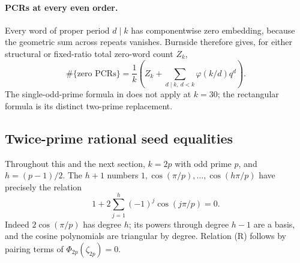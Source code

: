 \paragraph{PCRs at every even order.}
Every word of proper period $d\mid k$ has componentwise zero embedding, because the geometric sum across repeats vanishes. Burnside therefore gives, for either structural or fixed-ratio total zero-word count $Z_k$,
\[
\#\{\text{zero PCRs}\}=\frac1k\left(Z_k+\sum_{d\mid k,\ d<k}\varphi(k/d)q^d\right).
\]
The single-odd-prime formula in  does not apply at $k=30$; the rectangular formula is its distinct two-prime replacement.

\subsection{Twice-prime rational seed equalities}\label{ext:sec:seed}
Throughout this and the next section, $k=2p$ with odd prime $p$, and $h=(p-1)/2$. The $h+1$ numbers $1,\cos(\pi/p),\ldots,\cos(h\pi/p)$ have precisely the relation
\[
1+2\sum_{j=1}^{h}(-1)^j\cos(j\pi/p)=0.                         \tag{R}
\]
Indeed $2\cos(\pi/p)$ has degree $h$; its powers through degree $h-1$ are a basis, and the cosine polynomials are triangular by degree. Relation (R) follows by pairing terms of $\Phi_{2p}(\zeta_{2p})=0$.

